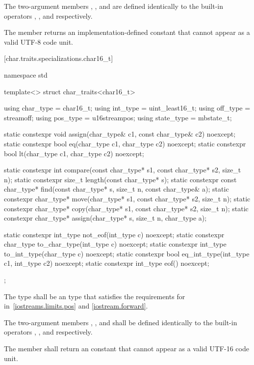 \pnum
The two-argument members , , and 
are defined identically to
the built-in operators \tcode{=}, \tcode{==}, and \tcode{<} respectively.

\pnum
The member  returns an implementation-defined constant
that cannot appear as a valid UTF-8 code unit.

[char.traits.specializations.char16_t]{}

%
\begin{codeblock}
namespace std {
  template<> struct char_traits<char16_t> {
    using char_type  = char16_t;
    using int_type   = uint_least16_t;
    using off_type   = streamoff;
    using pos_type   = u16streampos;
    using state_type = mbstate_t;

    static constexpr void assign(char_type& c1, const char_type& c2) noexcept;
    static constexpr bool eq(char_type c1, char_type c2) noexcept;
    static constexpr bool lt(char_type c1, char_type c2) noexcept;

    static constexpr int compare(const char_type* s1, const char_type* s2, size_t n);
    static constexpr size_t length(const char_type* s);
    static constexpr const char_type* find(const char_type* s, size_t n,
                                           const char_type& a);
    static constexpr char_type* move(char_type* s1, const char_type* s2, size_t n);
    static constexpr char_type* copy(char_type* s1, const char_type* s2, size_t n);
    static constexpr char_type* assign(char_type* s, size_t n, char_type a);

    static constexpr int_type not_eof(int_type c) noexcept;
    static constexpr char_type to_char_type(int_type c) noexcept;
    static constexpr int_type to_int_type(char_type c) noexcept;
    static constexpr bool eq_int_type(int_type c1, int_type c2) noexcept;
    static constexpr int_type eof() noexcept;
  };
}
\end{codeblock}

\pnum
The type
shall be an  type that satisfies the requirements
for  in~\ref{iostreams.limits.pos} and \ref{iostream.forward}.

\pnum
The two-argument members ,
, and  shall be defined identically to
the built-in operators \tcode{=}, \tcode{==}, and
\tcode{<} respectively.

\pnum
The member  shall return an
 constant that cannot appear
as a valid UTF-16 code unit.

